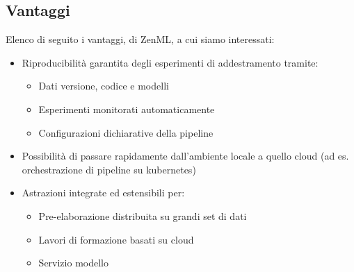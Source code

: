 \documentclass[12pt,a4paper]{report}
\begin{document}
\subsection{Vantaggi}
Elenco di seguito i vantaggi, di ZenML, a cui siamo interessati:
\begin{itemize}
    \item Riproducibilità garantita degli esperimenti di addestramento tramite:
    \begin{itemize}
        \item Dati versione, codice e modelli
        \item Esperimenti monitorati automaticamente
        \item Configurazioni dichiarative della pipeline
    \end{itemize}
    \item Possibilità di passare rapidamente dall'ambiente locale a quello cloud (ad es. orchestrazione di pipeline su kubernetes)
    \item Astrazioni integrate ed estensibili per:
    \begin{itemize}
        \item Pre-elaborazione distribuita su grandi set di dati
        \item Lavori di formazione basati su cloud        
        \item Servizio modello
    \end{itemize}
\end{itemize}
\end{document}
